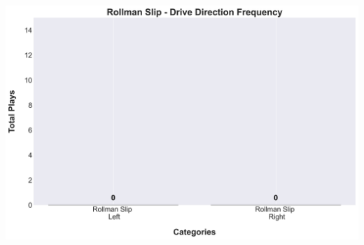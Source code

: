 \documentclass[a4paper,12pt]{article}
\begin{document}
\begin{table}[H]
{\begin{minipage}[t]{0.6\textwidth}
{\begin{tabular}
                
            
                
            
                
            
                
            
                
            
                
            
                
            
                
            
                
            
                
            
                
            
                
            
                
            


            \bottomrule
        \end{tabular}
        } %
    \end{minipage}
    } %
    \hfill
    \begin{minipage}[c]{0.35\textwidth} %
        \flushright
        \includegraphics[width=\textwidth, height=.14\textheight]{images/Rollman_SlipDirection_Freq.png} %
    \end{minipage}
    
\end{table}

\vspace{-1em} %
\vspace{-1em} %
\end{document}
